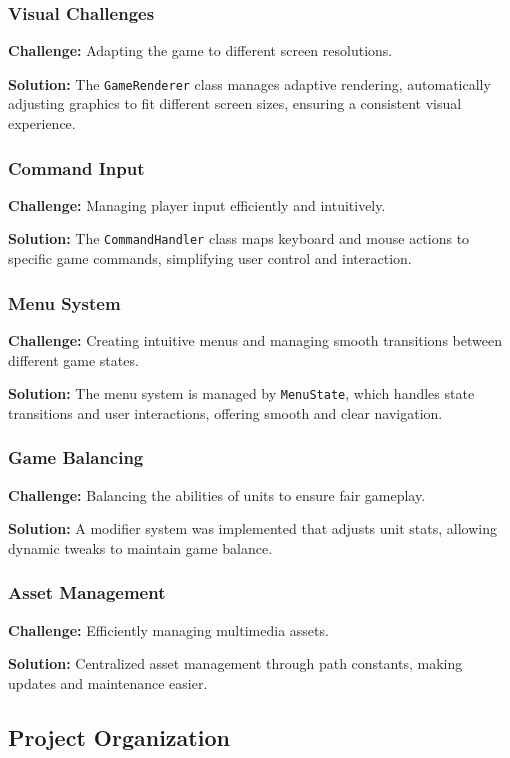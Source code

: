 \subsubsection{Visual Challenges}
\textbf{Challenge:} Adapting the game to different screen resolutions.

\textbf{Solution:} The \texttt{GameRenderer} class manages adaptive rendering, automatically adjusting graphics to fit different screen sizes, ensuring a consistent visual experience.

\subsubsection{Command Input}
\textbf{Challenge:} Managing player input efficiently and intuitively.

\textbf{Solution:} The \texttt{CommandHandler} class maps keyboard and mouse actions to specific game commands, simplifying user control and interaction.

\subsubsection{Menu System}
\textbf{Challenge:} Creating intuitive menus and managing smooth transitions between different game states.

\textbf{Solution:} The menu system is managed by \texttt{MenuState}, which handles state transitions and user interactions, offering smooth and clear navigation.

\subsubsection{Game Balancing}
\textbf{Challenge:} Balancing the abilities of units to ensure fair gameplay.

\textbf{Solution:} A modifier system was implemented that adjusts unit stats, allowing dynamic tweaks to maintain game balance.

\subsubsection{Asset Management}
\textbf{Challenge:} Efficiently managing multimedia assets.

\textbf{Solution:} Centralized asset management through path constants, making updates and maintenance easier.

\subsection{Project Organization}

